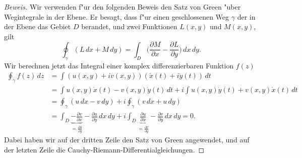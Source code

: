 \begin{proof}[Beweis]
Wir verwenden f"ur den folgenden Beweis den Satz von Green "uber
Wegintegrale in der Ebene.
Er besagt, dass f"ur einen geschlossenen Weg $\gamma$ der in der Ebene
das Gebiet $D$ berandet, und zwei Funktionen $L(x,y)$ und $M(x,y)$, gilt
\[
\oint_\gamma(L\,dx + M\,dy)
=
\int_D \biggl(\frac{\partial M}{\partial x}
-\frac{\partial L}{\partial y}\biggr)\,dx\,dy.
\]
Wir berechnen jetzt das Integral einer komplex differenzierbaren Funktion
$f(z)$
\begin{align*}
\oint_\gamma f(z)\,dz
&=
\int (u(x,y)+iv(x,y))(\dot x(t)+i\dot y(t))\,dt
\\
&=
\int u(x,y)\dot x(t) -v(x,y)\dot y(t)\,dt
+
i \int u(x,y)\dot y(t)+v(x,y)\dot x(t)\,dt
\\
&=\oint_\gamma(u\,dx - v\,dy) + i\oint_\gamma(v\,dx + u\,dy)
\\
&=
\int_D
\underbrace{-\frac{\partial v}{\partial x}}_{\textstyle=\frac{\partial u}{\partial y}}
-\frac{\partial u}{\partial y}
\,dx\,dy
+i
\int_D
\underbrace{\frac{\partial u}{\partial x}}_{\textstyle=\frac{\partial v}{\partial y}}
-\frac{\partial v}{\partial y}\,dx\,dy
=0.
\end{align*}
Dabei haben wir auf der dritten Zeile den Satz von Green angewendet,
und auf der letzten Zeile die Cauchy-Riemann-Differentialgleichungen.
\end{proof}

